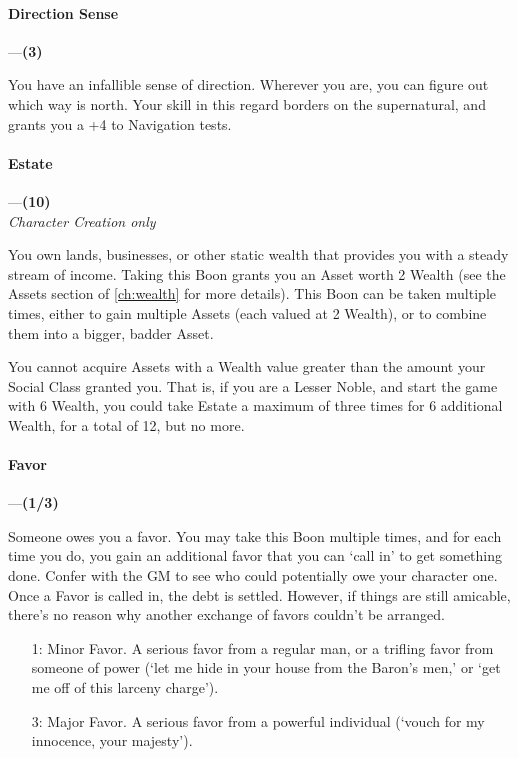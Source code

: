 \documentclass[oneside,11pt,english]{book}
\begin{document}
\paragraph{\label{boon:Direction Sense}Direction Sense}---\quad\textbf{(3)}\par
You have an infallible sense of direction. Wherever you are, you can figure out which way is north. Your skill in this regard borders on the supernatural, and grants you a +4 to Navigation tests.
\paragraph{\label{boon:Estate}Estate}---\quad\textbf{(10)}\\
\textit{Character Creation only}\par
You own lands, businesses, or other static wealth that provides you with a steady stream of income. 
Taking this Boon grants you an Asset worth 2 Wealth (see the Assets section of \autoref{ch:wealth} for more 
details). This Boon can be taken multiple times, either to gain multiple Assets (each valued at 2 Wealth), 
or to combine them into a bigger, badder Asset. 

You cannot acquire Assets with a Wealth value greater than the amount your Social Class granted you. 
That is, if you are a Lesser Noble, and start the game with 6 Wealth, you could take Estate a maximum of 
three times for 6 additional Wealth, for a total of 12, but no more. 
\paragraph{\label{boon:Favor}Favor}---\quad\textbf{(1/3)}\par
Someone owes you a favor. You may take this Boon multiple times, and for each time you do, you gain 
an additional favor that you can ‘call in’ to get something done. Confer with the GM to see who could 
potentially owe your character one. Once a Favor is called in, the debt is settled. However, if things are 
still amicable, there's no reason why another exchange of favors couldn't be arranged. 
\begin{itemize}
\item [1:] Minor Favor. A serious favor from a regular man, or a trifling favor from someone of power (‘let me hide in your house from the Baron's men,’ or ‘get me off of this larceny charge’).
\item [3:] Major Favor. A serious favor from a powerful individual (‘vouch for my innocence, your majesty’).
\end{itemize}
\end{document}
